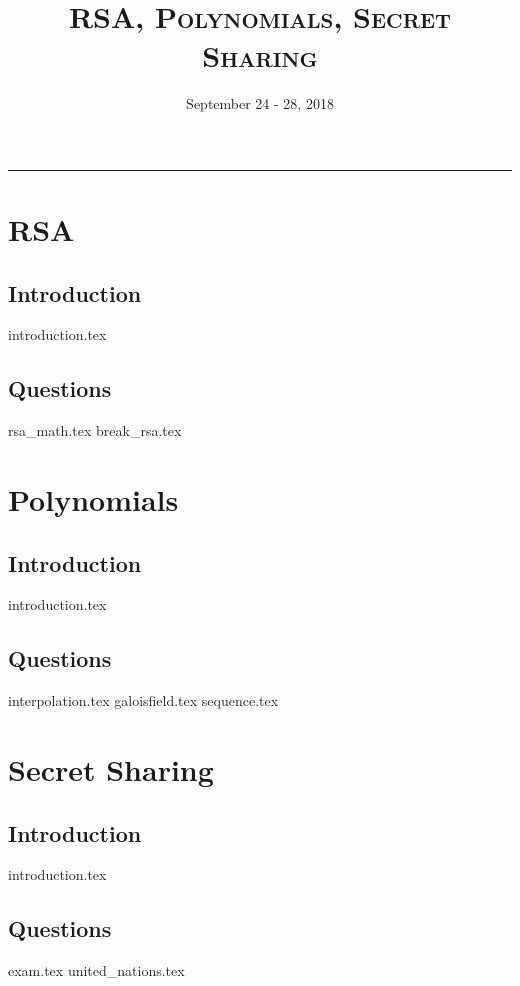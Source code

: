 \documentclass{exam}
\title{\Large \textsc{RSA, Polynomials, Secret Sharing}}
\date{September 24 - 28, 2018}
\begin{document}
\maketitle
\rule{\textwidth}{0.15em}
\fontsize{12}{15}\selectfont
\thispagestyle{empty}

\section{RSA}
\subsection{Introduction}
{introduction.tex}
\newpage
\subsection{Questions}
\begin{questions}
{rsa_math.tex}
{break_rsa.tex}
\end{questions}
\section{Polynomials}
\subsection{Introduction}
{introduction.tex}
\subsection{Questions}
\begin{questions}
{interpolation.tex}
{galoisfield.tex}
{sequence.tex}
\end{questions}
\newpage
\section{Secret Sharing}
\subsection{Introduction}
	{introduction.tex}
\subsection{Questions}
\begin{questions}
	{exam.tex}
	{united_nations.tex}
\end{questions}
\end{document}

